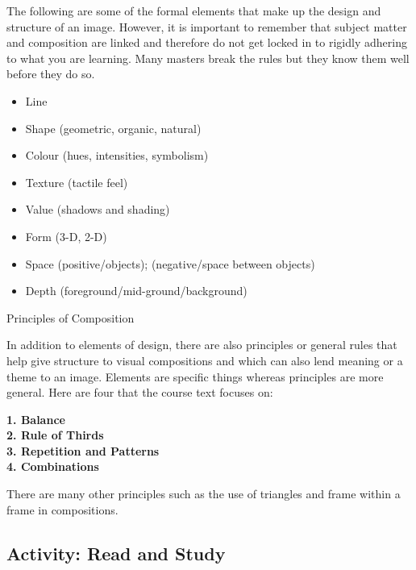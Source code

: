 \documentclass[
]{book}
\providecommand{\tightlist}{%
  \setlength{\itemsep}{0pt}\setlength{\parskip}{0pt}}
\begin{document}
The following are some of the formal elements that make up the design and structure of an image. However, it is important to remember that subject matter and composition are linked and therefore do not get locked in to rigidly adhering to what you are learning. Many masters break the rules but they know them well before they do so.

\begin{itemize}
\tightlist
\item
  Line\\
\item
  Shape (geometric, organic, natural)\\
\item
  Colour (hues, intensities, symbolism)\\
\item
  Texture (tactile feel)\\
\item
  Value (shadows and shading)\\
\item
  Form (3-D, 2-D)\\
\item
  Space (positive/objects); (negative/space between objects)\\
\item
  Depth (foreground/mid-ground/background)
\end{itemize}

{Principles of Composition}

In addition to elements of design, there are also principles or general rules that help give structure to visual compositions and which can also lend meaning or a theme to an image. Elements are specific things whereas principles are more general. Here are four that the course text focuses on:

\textbf{1. Balance}\\
\textbf{2. Rule of Thirds}\\
\textbf{3. Repetition and Patterns}\\
\textbf{4. Combinations}

There are many other principles such as the use of triangles and frame within a frame in compositions.

\hypertarget{activity-read-and-study}{%
\subsection*{Activity: Read and Study}\label{activity-read-and-study}}
\end{document}
